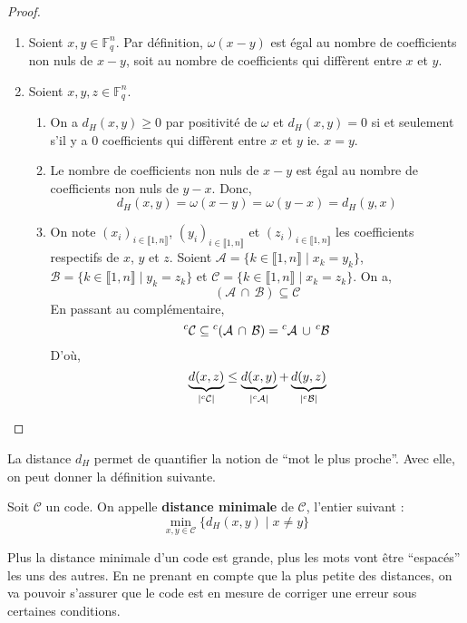 	\begin{proof}
		\begin{enumerate}[label=(\roman*)]
			\item Soient $x, y \in \mathbb{F}_q^n$. Par définition, $\omega(x-y)$ est égal au nombre de coefficients non nuls de $x-y$, soit au nombre de coefficients qui diffèrent entre $x$ et $y$.
			\item Soient $x, y, z \in \mathbb{F}_q^n$.
			\begin{enumerate}
				\item On a $d_H(x,y) \geq 0$ par positivité de $\omega$ et $d_H(x,y) = 0$ si et seulement s'il y a $0$ coefficients qui diffèrent entre $x$ et $y$ ie. $x = y$.
				\item Le nombre de coefficients non nuls de $x-y$ est égal au nombre de coefficients non nuls de $y-x$. Donc,
				\[ d_H(x,y) = \omega(x-y) = \omega(y-x) = d_H(y,x) \]
				\item On note $(x_i)_{i \in \llbracket 1, n \rrbracket}$, $(y_i)_{i \in \llbracket 1, n \rrbracket}$ et $(z_i)_{i \in \llbracket 1, n \rrbracket}$ les coefficients respectifs de $x$, $y$ et $z$. Soient $\mathcal{A} = \{ k \in \llbracket 1, n \rrbracket \mid x_k = y_k \}$, $\mathcal{B} = \{ k \in \llbracket 1, n \rrbracket \mid y_k = z_k \}$ et $\mathcal{C} = \{ k \in \llbracket 1, n \rrbracket \mid x_k = z_k \}$. On a,
				\[ (\mathcal{A} \, \cap \, \mathcal{B}) \subseteq \mathcal{C} \]
				En passant au complémentaire,
				\[ \mathstrut ^c\mathcal{C} \subseteq \mathstrut ^c(\mathcal{A} \, \cap \, \mathcal{B}) = \mathstrut ^c \mathcal{A} \, \cup \, \mathstrut ^c \mathcal{B} \]
				D'où,
				\[ \underbrace{d(x,z)}_{|\mathstrut ^c\mathcal{C}|} \leq \underbrace{d(x,y)}_{|\mathstrut ^c\mathcal{A}|} + \underbrace{d(y,z)}_{|\mathstrut ^c\mathcal{B}|} \]
			\end{enumerate}
		\end{enumerate}
	\end{proof}
	
	La distance $d_H$ permet de quantifier la notion de ``mot le plus proche''. Avec elle, on peut donner la définition suivante.
	
	\begin{definition}
		Soit $\mathcal{C}$ un code. On appelle \textbf{distance minimale} de $\mathcal{C}$, l'entier suivant :
		\[ \min_{x,y \in \mathcal{C}} \{ d_H(x,y) \mid x \neq y \} \]
	\end{definition}
	
	Plus la distance minimale d'un code est grande, plus les mots vont être ``espacés'' les uns des autres. En ne prenant en compte que la plus petite des distances, on va pouvoir s'assurer que le code est en mesure de corriger une erreur sous certaines conditions.
	
